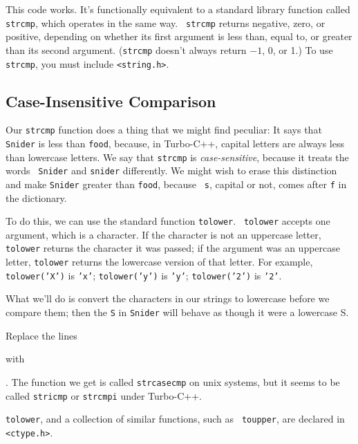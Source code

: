 This code works.  It's functionally equivalent to a standard library
function called {\tt strcmp}, which operates in the same way.  {\tt
strcmp} returns negative, zero, or positive, depending on whether its
first argument is less than, equal to, or greater than its second
argument.  ({\tt strcmp} doesn't always return $-1$, 0, or 1.)  To use
{\tt strcmp}, you must include {\tt <string.h>}.

\subsection{Case-Insensitive Comparison}

Our {\tt strcmp} function does a thing that we might find peculiar: It
says that {\tt Snider} is less than {\tt food}, because, in Turbo-C++,
capital letters are always less than lowercase letters.  We say that
{\tt strcmp} is {\em case-sensitive}\/, because it treats the words {\tt
Snider} and {\tt snider} differently.  We might wish to erase this
distinction and make {\tt Snider} greater than {\tt food}, because {\tt
s}, capital or not, comes after {\tt f} in the dictionary.

To do this, we can use the standard function {\tt tolower}.  {\tt
tolower} accepts one argument, which is a character.  If the character
is not an uppercase letter, {\tt tolower} returns the character it was
passed; if the argument was an uppercase letter, {\tt tolower} returns
the lowercase version of that letter.  For example, {\tt tolower('X')}
is {\tt 'x'}; {\tt tolower('y')} is {\tt 'y'}; {\tt tolower('2')} is
{\tt '2'}.

What we'll do is convert the characters in our strings to lowercase
before we compare them; then the {\tt S} in {\tt Snider} will behave as
though it were a lowercase S.  

Replace the lines

\begin{flushleft}
\verb%    else if ( *s1 < *s2 )% \\*
\verb%      return -1;% \\*
\verb%    else if ( *s1 > *s2 )% \\*
\verb%      return 1;	% \\*
\end{flushleft}

with

\begin{flushleft}
\verb%    else if ( tolower(*s1) < tolower(*s2) )% \\*
\verb%      return -1;% \\*
\verb%    else if ( tolower(*s1) > tolower(*s2) )% \\*
\verb%      return 1;	% \\*
\end{flushleft}

\noindent.  The function we get is called {\tt strcasecmp} on {\sc unix}
systems, but it seems to be called {\tt stricmp} or {\tt strcmpi} under
Turbo-C++.  

{\tt tolower}, and a collection of similar functions, such as {\tt
toupper}, are declared in {\tt <ctype.h>}.

